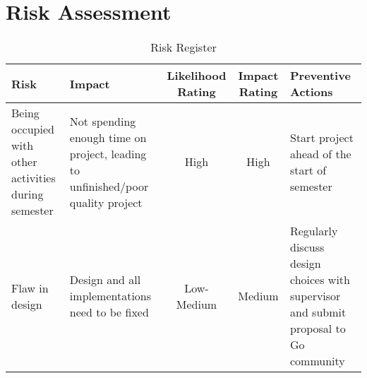 \section{Risk Assessment}

\def\arraystretch{1.5}
\begin{table}[h]
    \begin{tabular}{L L S S L}
        Risk                                                 &
        Impact                                               &
        Likelihood Rating                                    &
        Impact Rating                                        &
        Preventive Actions                                     \\
        \hline\hline
        Being occupied with other activities during semester &
        Not spending enough time on project, leading to unfinished/poor quality
        project                                              &
        High                                                 &
        High                                                 &
        Start project ahead of the start of semester           \\
        \hline
        Flaw in design                                       &
        Design and all implementations need to be fixed      &
        Low-Medium                                           &
        Medium                                               &
        Regularly discuss design choices with supervisor and
        submit proposal to Go community                        \\
        \hline
    \end{tabular}
    \caption{Risk Register}
\end{table}
